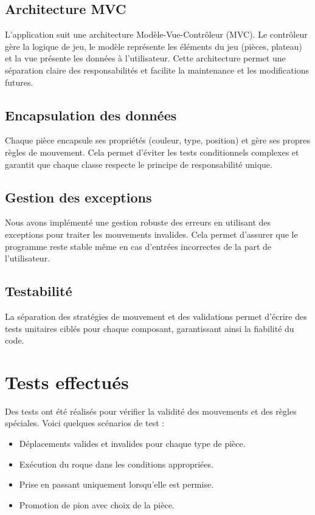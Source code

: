 \documentclass[12pt]{report}
\begin{document}
    \subsection*{Architecture MVC}
    L'application suit une architecture Modèle-Vue-Contrôleur (MVC). Le contrôleur gère la logique de jeu, le modèle représente les éléments du jeu (pièces, plateau) et la vue présente les données à l'utilisateur. Cette architecture permet une séparation claire des responsabilités et facilite la maintenance et les modifications futures.

    \subsection*{Encapsulation des données}
    Chaque pièce encapsule ses propriétés (couleur, type, position) et gère ses propres règles de mouvement. Cela permet d'éviter les tests conditionnels complexes et garantit que chaque classe respecte le principe de responsabilité unique.

    \subsection*{Gestion des exceptions}
    Nous avons implémenté une gestion robuste des erreurs en utilisant des exceptions pour traiter les mouvements invalides. Cela permet d'assurer que le programme reste stable même en cas d'entrées incorrectes de la part de l'utilisateur.

    \subsection*{Testabilité}
    La séparation des stratégies de mouvement et des validations permet d'écrire des tests unitaires ciblés pour chaque composant, garantissant ainsi la fiabilité du code.


    \section*{Tests effectués}
    Des tests ont été réalisés pour vérifier la validité des mouvements et des règles spéciales. Voici quelques scénarios de test :
    \begin{itemize}
        \item Déplacements valides et invalides pour chaque type de pièce.
        \item Exécution du roque dans les conditions appropriées.
        \item Prise en passant uniquement lorsqu'elle est permise.
        \item Promotion de pion avec choix de la pièce.
    \end{itemize}
\end{document}

